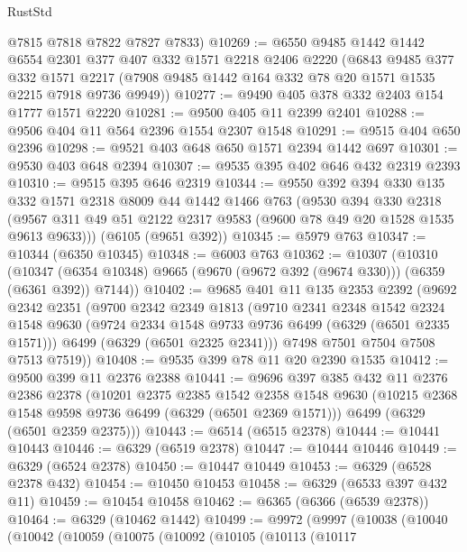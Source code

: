 \begin{lexlean}{RustStd}
\begin{coremodule}
{{      @7815
      @7818
      @7822
      @7827
      @7833)
@10269 := @6550
    @9485
    @1442
    @1442
    @6554
    @2301
    @377
    @407
    @332
    @1571
    @2218
    @2406
    @2220
    (@6843
      @9485
      @377
      @332
      @1571
      @2217
      (@7908 @9485 @1442 @164 @332 @78 @20 @1571 @1535 @2215 @7918 @9736 @9949))
@10277 := @9490 @405 @378 @332 @2403 @154 @1777 @1571 @2220
@10281 := @9500 @405 @11 @2399 @2401
@10288 := @9506 @404 @11 @564 @2396 @1554 @2307 @1548
@10291 := @9515 @404 @650 @2396
@10298 := @9521 @403 @648 @650 @1571 @2394 @1442 @697
@10301 := @9530 @403 @648 @2394
@10307 := @9535 @395 @402 @646 @432 @2319 @2393
@10310 := @9515 @395 @646 @2319
@10344 := @9550
    @392
    @394
    @330
    @135
    @332
    @1571
    @2318
    @8009
    @44
    @1442
    @1466
    @763
    (@9530
      @394
      @330
      @2318
      (@9567 @311 @49 @51 @2122 @2317 @9583 (@9600 @78 @49 @20 @1528 @1535 @9613 @9633)))
    (@6105 (@9651 @392))
@10345 := @5979 @763
@10347 := @10344 (@6350 @10345)
@10348 := @6003 @763
@10362 := @10307
    (@10310
      (@10347 (@6354 @10348) @9665 (@9670 (@9672 @392 (@9674 @330))) (@6359 (@6361 @392)) @7144))
@10402 := @9685
    @401
    @11
    @135
    @2353
    @2392
    (@9692
      @2342
      @2351
      (@9700
        @2342
        @2349
        @1813
        (@9710
          @2341
          @2348
          @1542
          @2324
          @1548
          @9630
          (@9724 @2334 @1548 @9733 @9736 @6499 (@6329 (@6501 @2335 @1571)))
          @6499
          (@6329 (@6501 @2325 @2341)))
        @7498
        @7501
        @7504
        @7508
        @7513
        @7519))
@10408 := @9535 @399 @78 @11 @20 @2390 @1535
@10412 := @9500 @399 @11 @2376 @2388
@10441 := @9696
    @397
    @385
    @432
    @11
    @2376
    @2386
    @2378
    (@10201
      @2375
      @2385
      @1542
      @2358
      @1548
      @9630
      (@10215 @2368 @1548 @9598 @9736 @6499 (@6329 (@6501 @2369 @1571)))
      @6499
      (@6329 (@6501 @2359 @2375)))
@10443 := @6514 (@6515 @2378)
@10444 := @10441 @10443
@10446 := @6329 (@6519 @2378)
@10447 := @10444 @10446
@10449 := @6329 (@6524 @2378)
@10450 := @10447 @10449
@10453 := @6329 (@6528 @2378 @432)
@10454 := @10450 @10453
@10458 := @6329 (@6533 @397 @432 @11)
@10459 := @10454 @10458
@10462 := @6365 (@6366 (@6539 @2378))
@10464 := @6329 (@10462 @1442)
@10499 := @9972
    (@9997
      (@10038
        (@10040
          (@10042
            (@10059
              (@10075
                (@10092
                  (@10105
                    (@10113
                      (@10117
}}
\end{coremodule}
\end{lexlean}
